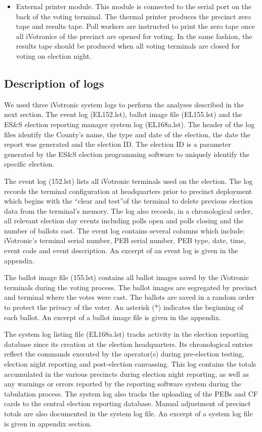\documentclass[letterpaper,twocolumn,10pt]{article}
\begin{document}
\begin{itemize}
\item External printer module. This module is connected to the serial port on the back of the voting terminal. The thermal printer produces the precinct zero tape and results tape. Poll workers are instructed to print the zero tape once all iVotronics of the precinct are opened for voting. In the same fashion, the results tape should be produced when all voting terminals are closed for voting on election night.
\end{itemize}

\subsection{Description of logs}
We used three iVotronic system logs to perform the analyses described in the next section. The event log (EL152.lst), ballot image file (EL155.lst) and the ES\&S election reporting manager system log (EL168a.lst).  The header of the log files identify the County's name, the type and date of the election, the date the report was generated and the election ID. The election ID is a parameter generated by the ES\&S election programming software to uniquely identify the specific election.

The event log (152.lst) lists all iVotronic terminals used on the election. The log records the terminal configuration at headquarters prior to precinct deployment which begins with the \textquotedblleft clear and test\textquotedblright of the terminal to delete previous election data from the terminal\textquoteright s memory. The log also records, in a chronological order, all relevant election day events including polls open and polls closing and the number of ballots cast.  The event log contains several columns which include: iVotronic's terminal serial number, PEB serial number, PEB type, date, time, event code and event description. An excerpt of  an event log is given in the appendix.

The ballot image file (155.lst) contains all ballot images saved by the iVotronic terminals during the voting process. The ballot images are segregated by precinct and terminal where the votes were cast. The ballots are saved in a random order to protect the privacy of the voter. An asterisk (*) indicates the beginning of each ballot. An excerpt of a ballot image file is given in the appendix.

The system log listing file (EL168a.lst) tracks activity in the election reporting database since its creation at the election headquarters. Its chronological entries reflect the commands executed by the operator(s) during  pre-election testing, election night reporting and post-election canvassing. This log contains the totals accumulated in the various precincts during election night reporting, as well as any warnings or errors reported by the reporting software system during the tabulation process. The system log also tracks the uploading of the PEBs and CF cards to the central election reporting database. Manual adjustment of precinct totals are also documented in the system log file. An excerpt of a system log file is given in appendix section.
\end{document}
